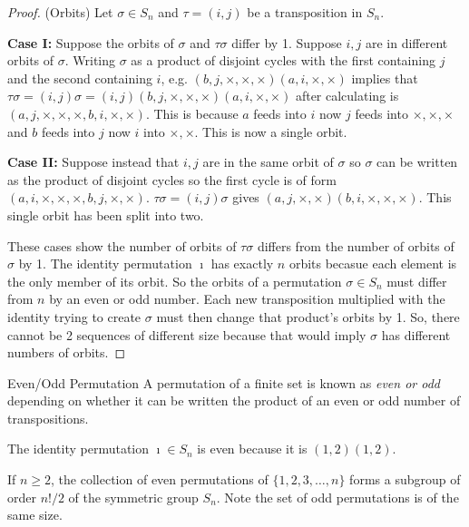 \begin{proof}(Orbits)
    Let $\sigma \in S_n$ and $\tau = (i,j)$ be a transposition in $S_n$. 
    
    \textbf{Case I:} Suppose the orbits of $\sigma$ and $\tau\sigma$ differ by 1. Suppose $i,j$ are in different orbits of $\sigma$. Writing $\sigma$ as a product of disjoint cycles with the first containing $j$ and the second containing $i$, e.g. $(b, j, \times, \times, \times)(a, i, \times, \times)$ implies that $\tau\sigma = (i,j)\sigma = (i,j)(b, j, \times, \times, \times)(a, i, \times, \times)$ after calculating is $(a,j,\times,\times,\times,b,i,\times,\times)$. This is because $a$ feeds into $i$ now $j$ feeds into $\times,\times,\times$ and $b$ feeds into $j$ now $i$ into $\times, \times$. This is now a single orbit.
    
    \textbf{Case II:} Suppose instead that $i,j$ are in the same orbit of $\sigma$ so $\sigma$ can be written as the product of disjoint cycles so the first cycle is of form $(a,i,\times,\times,\times,b,j,\times,\times)$. $\tau\sigma=(i,j)\sigma$ gives $(a,j,\times,\times)(b,i,\times,\times,\times)$. This single orbit has been split into two.
    
    These cases show the number of orbits of $\tau\sigma$ differs from the number of orbits of $\sigma$ by 1. The identity permutation $\imath$ has exactly $n$ orbits becasue each element is the only member of its orbit. So the orbits of a permutation $\sigma \in S_n$ must differ from $n$ by an even or odd number. Each new transposition multiplied with the identity trying to create $\sigma$ must then change that product's orbits by 1. So, there cannot be 2 sequences of different size because that would imply $\sigma$ has different numbers of orbits.
\end{proof}
\begin{definition}{Even/Odd Permutation}
    A permutation of a finite set is known as \emph{even or odd} depending on whether it can be written the product of an even or odd number of transpositions.
\end{definition}
\begin{example}
    The identity permutation $\imath \in S_n$ is even because it is $(1,2)(1,2)$.  
\end{example}
\begin{theorem}
    If $n \geq 2$, the collection of even permutations of $\{1,2,3,\ldots,n\}$ forms a subgroup of order $n!/2$ of the symmetric group $S_n$. Note the set of odd permutations is of the same size.
\end{theorem}
